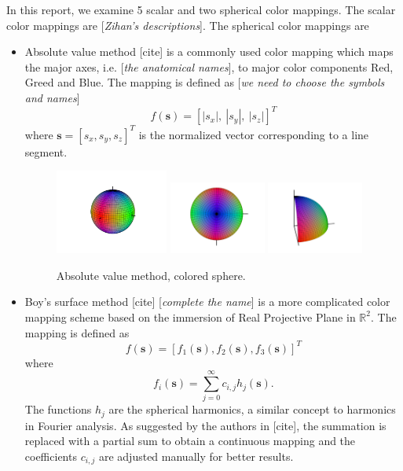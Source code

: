 \documentclass{article}
\newcommand{\saeed}[1]{{\color{red}[\textit{#1}]}}
\begin{document}
In this report, we examine 5 scalar and two spherical color mappings. The scalar color mappings are \saeed{Zihan's descriptions}. The spherical color mappings are 
\begin{itemize}
	\item Absolute value method [cite] is a commonly used color mapping which maps the major axes, i.e. \saeed{the anatomical names}, to major color components Red, Greed and Blue. The mapping is defined as \saeed{we need to choose the symbols and names}
	\begin{equation}
		f(\mathbf{s})=[|s_x|, \ |s_y|, \ |s_z|]^T
	\end{equation}
	where $\mathbf{s}=[s_x ,s_y, s_z]^T$ is the normalized vector corresponding to a line segment. 
	\begin{figure}
		\centering
		\includegraphics[width=0.35\textwidth]{absolute}
		\includegraphics[width=0.3\textwidth]{absolute_top}
		\includegraphics[width=0.3\textwidth]{absolute_octant}
		\caption{Absolute value method, colored sphere.}
	\end{figure}
	\item Boy's surface method [cite] \saeed{complete the name} is a more complicated color mapping scheme based on the immersion of Real Projective Plane in $\mathbb{R}^2$. The mapping is defined as 
	\begin{equation}
		f(\mathbf{s})=[f_1(\mathbf{s}), f_2(\mathbf{s}), f_3(\mathbf{s})]^T
	\end{equation}
	where 
	\begin{equation}
		f_i(\mathbf{s})=\sum_{j=0}^{\infty} c_{i,j} h_j(\mathbf{s}).
	\end{equation}
	The functions $h_j$ are the spherical harmonics, a similar concept to harmonics in Fourier analysis. As suggested by the authors in [cite], the summation is replaced with a partial sum to obtain a continuous mapping and the coefficients $c_{i,j}$ are adjusted manually for better results. 
\end{itemize}
\end{document}
